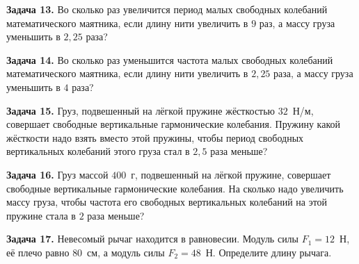 \begin{taskbasic}[code={\label{task:dem26_v13_n4}}]
\textbf{Задача 13.} Во сколько раз увеличится период малых свободных колебаний математического маятника, если длину нити увеличить в $9$ раз, а массу груза уменьшить в $2{,}25$ раза?

\end{taskbasic}

\begin{taskbasic}[code={\label{task:dem26_v14_n4}}]
\textbf{Задача 14.} Во сколько раз уменьшится частота малых свободных колебаний математического маятника, если длину нити увеличить в $2{,}25$ раза, а массу груза уменьшить в $4$ раза?

\end{taskbasic}

\begin{taskbasic}[code={\label{task:dem26_v15_n4}}]
\textbf{Задача 15.} Груз, подвешенный на лёгкой пружине жёсткостью $32$~Н/м, совершает свободные вертикальные гармонические колебания. Пружину какой жёсткости надо взять вместо этой пружины, чтобы период свободных вертикальных колебаний этого груза стал в $2{,}5$ раза меньше?

\end{taskbasic}

\begin{taskbasic}[code={\label{task:dem26_v16_n4}}]
\textbf{Задача 16.} Груз массой $400$~г, подвешенный на лёгкой пружине, совершает свободные вертикальные гармонические колебания. На сколько надо увеличить массу груза, чтобы частота его свободных вертикальных колебаний на этой пружине стала в $2$ раза меньше?

\end{taskbasic}

\begin{taskbasic}[code={\label{task:dem26_v17_n4}}]
\textbf{Задача 17.} Невесомый рычаг находится в равновесии. Модуль силы $F_{1} = 12$~Н, её плечо равно $80$~см, а модуль силы $F_{2} = 48$~Н. Определите длину рычага.

\end{taskbasic}

